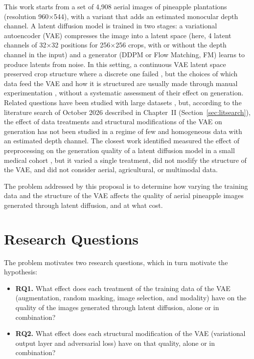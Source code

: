 This work starts from a set of 4,908 aerial images of pineapple plantations (resolution 960$\times$544), with a variant that adds an estimated monocular depth channel. A latent diffusion model is trained in two stages: a variational autoencoder (VAE) compresses the image into a latent space (here, 4 latent channels of 32$\times$32 positions for 256$\times$256 crops, with or without the depth channel in the input) and a generator (DDPM or Flow Matching, FM) learns to produce latents from noise. In this setting, a continuous VAE latent space preserved crop structure where a discrete one failed \cite{Gonzalez2026}, but the choices of which data feed the VAE and how it is structured are usually made through manual experimentation \cite{Gonzalez2026}, without a systematic assessment of their effect on generation. Related questions have been studied with large datasets \cite{Yao2025,Skorokhodov2025,Zhong2026}, but, according to the literature search of October 2026 described in Chapter~II (Section~\ref{sec:litsearch}), the effect of data treatments and structural modifications of the VAE on generation has not been studied in a regime of few and homogeneous data with an estimated depth channel. The closest work identified measured the effect of preprocessing on the generation quality of a latent diffusion model in a small medical cohort \cite{Fallah2026}, but it varied a single treatment, did not modify the structure of the VAE, and did not consider aerial, agricultural, or multimodal data.

The problem addressed by this proposal is to determine how varying the training data and the structure of the VAE affects the quality of aerial pineapple images generated through latent diffusion, and at what cost.

\section{Research Questions}

The problem motivates two research questions, which in turn motivate the hypothesis:

\begin{itemize}
  \item \textbf{RQ1.} What effect does each treatment of the training data of the VAE (augmentation, random masking, image selection, and modality) have on the quality of the images generated through latent diffusion, alone or in combination?
  \item \textbf{RQ2.} What effect does each structural modification of the VAE (variational output layer and adversarial loss) have on that quality, alone or in combination?
\end{itemize}

